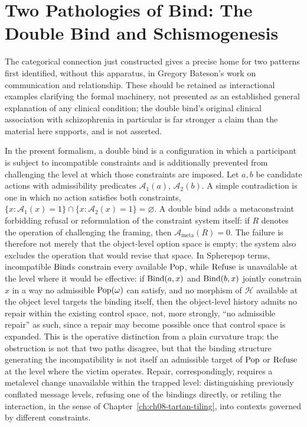 \section{Two Pathologies of Bind: The Double Bind and Schismogenesis}

The categorical connection just constructed gives a precise home for two patterns first identified, without this apparatus, in Gregory Bateson's work on communication and relationship. These should be retained as interactional examples clarifying the formal machinery, not presented as an established general explanation of any clinical condition; the double bind's original clinical association with schizophrenia in particular is far stronger a claim than the material here supports, and is not asserted.

In the present formalism, a double bind is a configuration in which a participant is subject to incompatible constraints and is additionally prevented from challenging the level at which those constraints are imposed. Let $a,b$ be candidate actions with admissibility predicates $\mathcal{A}_1(a)$, $\mathcal{A}_2(b)$. A simple contradiction is one in which no action satisfies both constraints, $\{x : \mathcal{A}_1(x)=1\} \cap \{x : \mathcal{A}_2(x)=1\} = \varnothing$. A double bind adds a metaconstraint forbidding refusal or reformulation of the constraint system itself: if $R$ denotes the operation of challenging the framing, then $\mathcal{A}_{\mathrm{meta}}(R) = 0$. The failure is therefore not merely that the object-level option space is empty; the system also excludes the operation that would revise that space. In Spherepop terms, incompatible $\mathrm{Bind}$s constrain every available $\mathrm{Pop}$, while $\mathrm{Refuse}$ is unavailable at the level where it would be effective: if $\mathrm{Bind}(a,x)$ and $\mathrm{Bind}(b,x)$ jointly constrain $x$ in a way no admissible $\mathrm{Pop}(\omega)$ can satisfy, and no morphism of $\mathcal{H}$ available at the object level targets the binding itself, then the object-level history admits no repair within the existing control space, not, more strongly, ``no admissible repair'' as such, since a repair may become possible once that control space is expanded. This is the operative distinction from a plain curvature trap: the obstruction is not that two paths disagree, but that the binding structure generating the incompatibility is not itself an admissible target of $\mathrm{Pop}$ or $\mathrm{Refuse}$ at the level where the victim operates. Repair, correspondingly, requires a metalevel change unavailable within the trapped level: distinguishing previously conflated message levels, refusing one of the bindings directly, or retiling the interaction, in the sense of Chapter~\ref{ch:ch08-tartan-tiling}, into contexts governed by different constraints.

